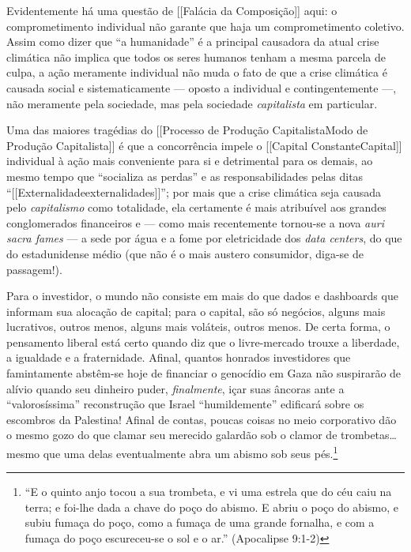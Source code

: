 Evidentemente há uma questão de {[}{[}Falácia da Composição{]}{]} aqui:
o comprometimento individual não garante que haja um comprometimento
coletivo. Assim como dizer que ``a humanidade'' é a principal causadora
da atual crise climática não implica que todos os seres humanos tenham a
mesma parcela de culpa, a ação meramente individual não muda o fato de
que a crise climática é causada social e sistematicamente --- oposto a
individual e contingentemente ---, não meramente pela sociedade, mas
pela sociedade \emph{capitalista} em particular.

Uma das maiores tragédias do {[}{[}Processo de Produção
Capitalista\textbar Modo de Produção Capitalista{]}{]} é que a
concorrência impele o {[}{[}Capital Constante\textbar Capital{]}{]}
individual à ação mais conveniente para si e detrimental para os demais,
ao mesmo tempo que ``socializa as perdas'' e as responsabilidades pelas
ditas ``{[}{[}Externalidade\textbar externalidades{]}{]}''; por mais que
a crise climática seja causada pelo \emph{capitalismo} como totalidade,
ela certamente é mais atribuível aos grandes conglomerados financeiros e
--- como mais recentemente tornou-se a nova \emph{auri sacra fames} ---
a sede por água e a fome por eletricidade dos \emph{data centers}, do
que do estadunidense médio (que não é o mais austero consumidor, diga-se
de passagem!).

Para o investidor, o mundo não consiste em mais do que dados e
dashboards que informam sua alocação de capital; para o capital, são só
negócios, alguns mais lucrativos, outros menos, alguns mais voláteis,
outros menos. De certa forma, o pensamento liberal está certo quando diz
que o livre-mercado trouxe a liberdade, a igualdade e a fraternidade.
Afinal, quantos honrados investidores que famintamente abstêm-se hoje de
financiar o genocídio em Gaza não suspirarão de alívio quando seu
dinheiro puder, \emph{finalmente}, içar suas âncoras ante a
``valorosíssima'' reconstrução que Israel ``humildemente'' edificará
sobre os escombros da Palestina! Afinal de contas, poucas coisas no meio
corporativo dão o mesmo gozo do que clamar seu merecido galardão sob o
clamor de trombetas\ldots{} mesmo que uma delas eventualmente abra um
abismo sob seus pés.\footnote{``E o quinto anjo tocou a sua trombeta, e
  vi uma estrela que do céu caiu na terra; e foi-lhe dada a chave do
  poço do abismo. E abriu o poço do abismo, e subiu fumaça do poço, como
  a fumaça de uma grande fornalha, e com a fumaça do poço escureceu-se o
  sol e o ar.'' (Apocalipse 9:1-2)}

